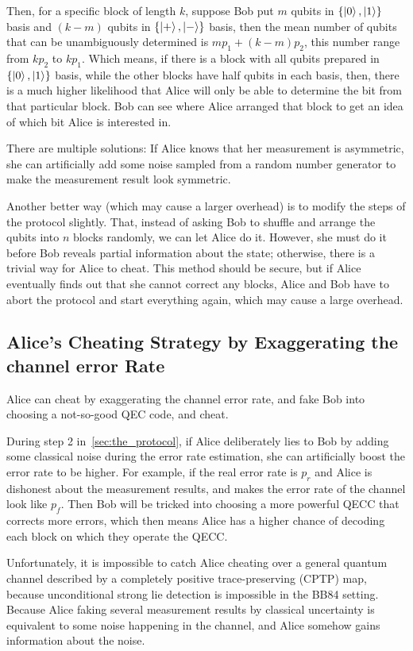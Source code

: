 \documentclass[%
 reprint,
superscriptaddress,
 amsmath,amssymb,
 aps,
]{revtex4-2}
\begin{document}
Then, for a specific block of length $k$, suppose Bob put $m$ qubits in $\{\ket{0}, \ket{1}\}$ basis and $(k-m)$ qubits in $\{\ket{+}, \ket{-}\}$ basis, then the mean number of qubits that can be unambiguously determined is $mp_1+(k-m)p_2$, this number range from $kp_2$ to $kp_1$. Which means, if there is a block with all qubits prepared in $\{\ket{0}, \ket{1}\}$ basis, while the other blocks have half qubits in each basis, then, there is a much higher likelihood that Alice will only be able to determine the bit from that particular block. Bob can see where Alice arranged that block to get an idea of which bit Alice is interested in.

There are multiple solutions: If Alice knows that her measurement is asymmetric, she can artificially add some noise sampled from a random number generator to make the measurement result look symmetric. 

Another better way (which may cause a larger overhead) is to modify the steps of the protocol slightly. That, instead of asking Bob to shuffle and arrange the qubits into $n$ blocks randomly, we can let Alice do it. However, she must do it before Bob reveals partial information about the state; otherwise, there is a trivial way for Alice to cheat. This method should be secure, but if Alice eventually finds out that she cannot correct any blocks, Alice and Bob have to abort the protocol and start everything again, which may cause a large overhead.

\subsection{Alice's Cheating Strategy by Exaggerating the channel error Rate}
\label{sec:Alice_cheating_error_rate}

Alice can cheat by exaggerating the channel error rate, and fake Bob into choosing a not-so-good QEC code, and cheat.

During step 2 in~\ref{sec:the_protocol}, if Alice deliberately lies to Bob by adding some classical noise during the error rate estimation, she can artificially boost the error rate to be higher. For example, if the real error rate is $p_r$ and Alice is dishonest about the measurement results, and makes the error rate of the channel look like $p_f$. Then Bob will be tricked into choosing a more powerful QECC that corrects more errors, which then means Alice has a higher chance of decoding each block on which they operate the QECC.

Unfortunately, it is impossible to catch Alice cheating over a general quantum channel described by a completely positive trace-preserving (CPTP) map, because unconditional strong lie detection is impossible in the BB84 setting. Because Alice faking several measurement results by classical uncertainty is equivalent to some noise happening in the channel, and Alice somehow gains information about the noise.
\end{document}
